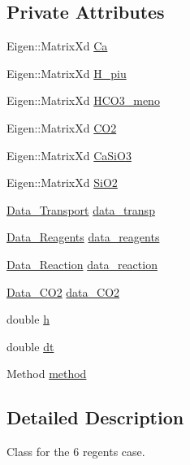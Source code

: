 \subsection*{Private Attributes}
\begin{DoxyCompactItemize}
\item 
Eigen\+::\+Matrix\+Xd \hyperlink{classConcentration_a65164ca0c1bcb6865e0aa9cf2d60a630}{Ca}
\item 
Eigen\+::\+Matrix\+Xd \hyperlink{classConcentration_a686fda40d81196734de4f3326052dab7}{H\+\_\+piu}
\item 
Eigen\+::\+Matrix\+Xd \hyperlink{classConcentration_a4458882575c5a611280e0ea0a4bc3e96}{H\+C\+O3\+\_\+meno}
\item 
Eigen\+::\+Matrix\+Xd \hyperlink{classConcentration_af4f0c95c46eee5f4f1f595ce408447bd}{C\+O2}
\item 
Eigen\+::\+Matrix\+Xd \hyperlink{classConcentration_a20bfffe357c2fab8804f00a6a43f309c}{Ca\+Si\+O3}
\item 
Eigen\+::\+Matrix\+Xd \hyperlink{classConcentration_a2b06dc966fe05efd87ea6719a3666fb7}{Si\+O2}
\item 
\hyperlink{classData__Transport}{Data\+\_\+\+Transport} \hyperlink{classConcentration_ae1b0828446b189440a98f1c7a5d81713}{data\+\_\+transp}
\item 
\hyperlink{classData__6Reagents}{Data\+\_\+Reagents} \hyperlink{classConcentration_a2ab60402f98e90ed314d6568db042211}{data\+\_\+reagents}
\item 
\hyperlink{classData__Reaction}{Data\+\_\+\+Reaction} \hyperlink{classConcentration_aa648a3d29eb835841a10925b3c67e87c}{data\+\_\+reaction}
\item 
\hyperlink{classData__CO2}{Data\+\_\+\+C\+O2} \hyperlink{classConcentration_a040655810176004deaa482ad2dd54154}{data\+\_\+\+C\+O2}
\item 
double \hyperlink{classConcentration_af6109bf824236bb512b6acd084f81b15}{h}
\item 
double \hyperlink{classConcentration_a3eafd293f64c3e762e8a8a8a50271727}{dt}
\item 
Method \hyperlink{classConcentration_a8ac0f36cf7d5f6d170fcd4a6b8bd9b28}{method}
\end{DoxyCompactItemize}


\subsection{Detailed Description}
Class for the 6 regents case. 

